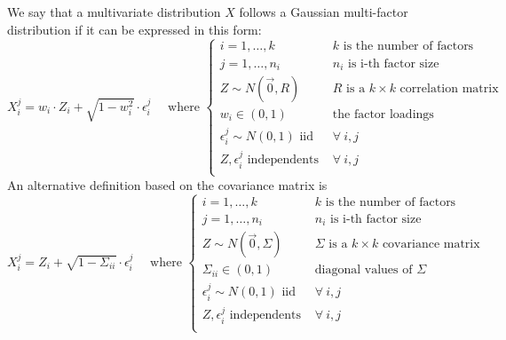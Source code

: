 \documentclass[11pt,fleqn]{book} %
\begin{document}
\begin{definition}
	\label{def:gmfm}
	We say that a multivariate distribution $X$ follows a Gaussian multi-factor
	distribution if it can be expressed in this form:
	\begin{displaymath}
		X_i^j = w_i \cdot Z_i + \sqrt{1-w_i^2} \cdot \epsilon_i^j
		\quad \text{ where } \left\{
		\begin{array}{ll}
			i = 1, \dots, k & \text{$k$ is the number of factors} \\
			j = 1, \dots, n_i & \text{$n_i$ is i-th factor size} \\
			Z \sim N(\vec{0},R) & \text{$R$ is a $k {\times} k$ correlation matrix} \\
			w_i \in (0,1) & \text{the factor loadings } \\
			\epsilon_i^j \sim N(0,1) \text { iid } & \forall\ i,j \\
			Z, \epsilon_i^j \text{ independents } & \forall\ i,j \\
		\end{array}
		\right.
	\end{displaymath}
	An alternative definition based on the covariance matrix is
	\begin{displaymath}
		X_i^j = Z_i + \sqrt{1-\Sigma_{ii}} \cdot \epsilon_i^j
		\quad \text{ where } \left\{
		\begin{array}{ll}
			i = 1, \dots, k & \text{$k$ is the number of factors} \\
			j = 1, \dots, n_i & \text{$n_i$ is i-th factor size} \\
			Z \sim N(\vec{0},\Sigma) & \text{$\Sigma$ is a $k {\times} k$ covariance matrix} \\
			\Sigma_{ii} \in (0,1) & \text{diagonal values of $\Sigma$} \\
			\epsilon_i^j \sim N(0,1) \text { iid } & \forall\ i,j \\
			Z, \epsilon_i^j \text{ independents } & \forall\ i,j \\
		\end{array}
		\right.
	\end{displaymath}
\end{definition}
\end{document}
